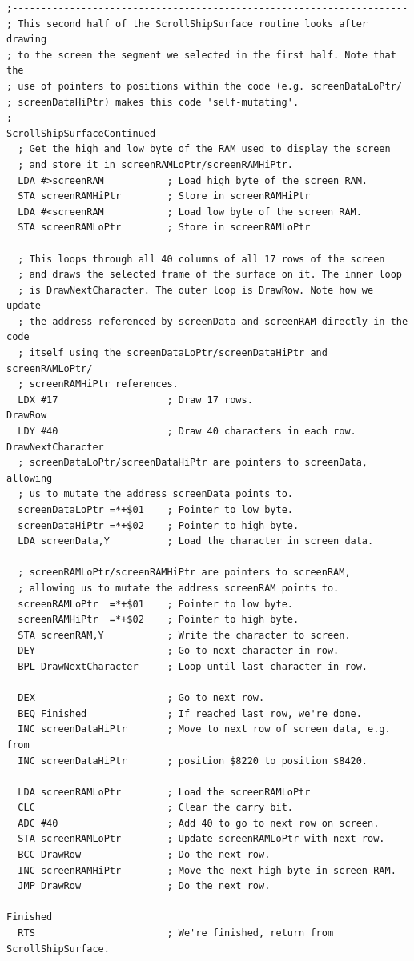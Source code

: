 \clearpage
\begin{lstlisting}
;---------------------------------------------------------------------
; This second half of the ScrollShipSurface routine looks after drawing
; to the screen the segment we selected in the first half. Note that the
; use of pointers to positions within the code (e.g. screenDataLoPtr/
; screenDataHiPtr) makes this code 'self-mutating'.
;---------------------------------------------------------------------
ScrollShipSurfaceContinued
  ; Get the high and low byte of the RAM used to display the screen
  ; and store it in screenRAMLoPtr/screenRAMHiPtr.
  LDA #>screenRAM           ; Load high byte of the screen RAM.
  STA screenRAMHiPtr        ; Store in screenRAMHiPtr
  LDA #<screenRAM           ; Load low byte of the screen RAM.
  STA screenRAMLoPtr        ; Store in screenRAMLoPtr

  ; This loops through all 40 columns of all 17 rows of the screen
  ; and draws the selected frame of the surface on it. The inner loop
  ; is DrawNextCharacter. The outer loop is DrawRow. Note how we update
  ; the address referenced by screenData and screenRAM directly in the code
  ; itself using the screenDataLoPtr/screenDataHiPtr and screenRAMLoPtr/
  ; screenRAMHiPtr references.
  LDX #17                   ; Draw 17 rows.
DrawRow   
  LDY #40                   ; Draw 40 characters in each row.
DrawNextCharacter   
  ; screenDataLoPtr/screenDataHiPtr are pointers to screenData, allowing
  ; us to mutate the address screenData points to.
  screenDataLoPtr =*+$01    ; Pointer to low byte.
  screenDataHiPtr =*+$02    ; Pointer to high byte.
  LDA screenData,Y          ; Load the character in screen data.

  ; screenRAMLoPtr/screenRAMHiPtr are pointers to screenRAM, 
  ; allowing us to mutate the address screenRAM points to.
  screenRAMLoPtr  =*+$01    ; Pointer to low byte.
  screenRAMHiPtr  =*+$02    ; Pointer to high byte.
  STA screenRAM,Y           ; Write the character to screen.
  DEY                       ; Go to next character in row.
  BPL DrawNextCharacter     ; Loop until last character in row.

  DEX                       ; Go to next row.
  BEQ Finished              ; If reached last row, we're done.
  INC screenDataHiPtr       ; Move to next row of screen data, e.g. from
  INC screenDataHiPtr       ; position $8220 to position $8420.

  LDA screenRAMLoPtr        ; Load the screenRAMLoPtr
  CLC                       ; Clear the carry bit.
  ADC #40                   ; Add 40 to go to next row on screen. 
  STA screenRAMLoPtr        ; Update screenRAMLoPtr with next row.
  BCC DrawRow               ; Do the next row.
  INC screenRAMHiPtr        ; Move the next high byte in screen RAM.
  JMP DrawRow               ; Do the next row.

Finished
  RTS                       ; We're finished, return from ScrollShipSurface.
\end{lstlisting}
\clearpage

